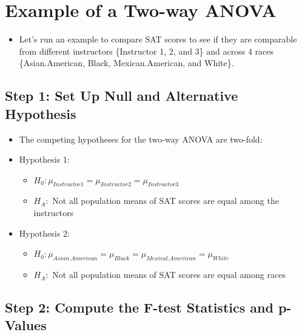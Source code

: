 \documentclass[
  letterpaper,
  DIV=11,
  numbers=noendperiod]{scrreprt}
\providecommand{\tightlist}{%
  \setlength{\itemsep}{0pt}\setlength{\parskip}{0pt}}\usepackage{longtable,booktabs,array}
\begin{document}
\section{Example of a Two-way ANOVA}\label{example-of-a-two-way-anova}

\begin{itemize}
\tightlist
\item
  Let's run an example to compare SAT scores to see if they are
  comparable from different instructors \{Instructor 1, 2, and 3\} and
  across 4 races \{Asian.American, Black, Mexican.American, and White\}.
\end{itemize}

\subsection{Step 1: Set Up Null and Alternative
Hypothesis}\label{step-1-set-up-null-and-alternative-hypothesis-1}

\begin{itemize}
\item
  The competing hypotheses for the two-way ANOVA are two-fold:
\item
  Hypothesis 1:

  \begin{itemize}
  \tightlist
  \item
    \(H_0: \mu_{Instructor1} = \mu_{Instructor2}= \mu_{Instructor3}\)
  \item
    \(H_A:\) Not all population means of SAT scores are equal among the
    instructors
  \end{itemize}
\item
  Hypothesis 2:

  \begin{itemize}
  \tightlist
  \item
    \(H_0: \mu_{Asian.American} = \mu_{Black} = \mu_{Mexical.American} =  \mu_{White}\)
  \item
    \(H_A:\) Not all population means of SAT scores are equal among
    races
  \end{itemize}
\end{itemize}

\subsection{Step 2: Compute the F-test Statistics and
p-Values}\label{step-2-compute-the-f-test-statistics-and-p-values}
\end{document}
